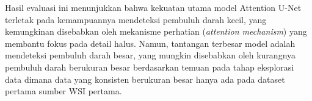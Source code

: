 \noindent Hasil evaluasi ini menunjukkan bahwa kekuatan utama model Attention U-Net terletak pada kemampuannya mendeteksi pembuluh darah kecil, yang kemungkinan disebabkan oleh mekanisme perhatian (\textit{attention mechanism}) yang membantu fokus pada detail halus. Namun, tantangan terbesar model adalah mendeteksi pembuluh darah besar, yang mungkin disebabkan oleh kurangnya pembuluh darah berukuran besar berdasarkan temuan pada tahap eksplorasi data dimana data yang konsisten berukuran besar hanya ada pada dataset pertama sumber WSI pertama.













